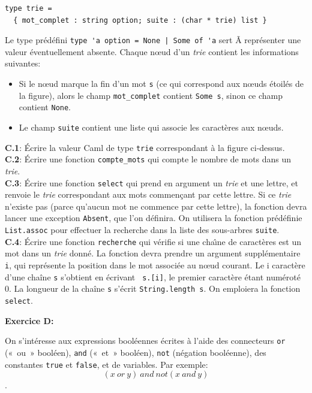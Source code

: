 \documentclass[11pt, a4paper]{article}
\begin{document}
\begin{verbatim}
type trie =
  { mot_complet : string option; suite : (char * trie) list }
\end{verbatim}

Le type prédéfini \verb+type 'a option = None | Some of 'a+ sert Ã
représenter une valeur éventuellement absente. Chaque nœud d'un
\emph{trie} contient les informations suivantes:

\begin{itemize}
  \item Si le nœud marque la fin d'un mot {\tt s} (ce qui
        correspond aux nœuds étoilés de la figure), alors le champ
        {\tt mot\_complet} contient {\tt Some s}, sinon ce champ
        contient {\tt None}.

  \item Le champ {\tt suite} contient une liste qui associe les
        caractères aux nœuds.
\end{itemize}

\medskip

\noindent
\textbf{C.1}: Écrire la valeur Caml de type \verb+trie+ correspondant
à la figure ci-dessus.\\
\textbf{C.2}: Écrire une fonction \texttt{compte\_mots} qui compte le
nombre de mots dans un \emph{trie}.\\
\textbf{C.3}: Écrire une fonction \texttt{select} qui prend en
argument un \emph{trie} et une lettre, et renvoie le \emph{trie}
correspondant aux mots commençant par cette lettre. Si ce \emph{trie}
n'existe pas (parce qu'aucun mot ne commence par cette lettre), la
fonction devra lancer une exception {\tt Absent}, que l'on
définira. On utilisera la fonction prédéfinie \texttt{List.assoc} pour
effectuer la recherche dans la liste des sous-arbres \verb+suite+.\\
\textbf{C.4}: Écrire une fonction \texttt{recherche} qui vérifie si
une cha\^{\i}ne de caractères est un mot dans un {\em trie}
donné. La fonction devra prendre un argument supplémentaire {\tt i},
qui représente la position dans le mot associée au nœud courant.
Le i\ieme{} caractère d'une chaîne {\tt s} s'obtient en écrivant {\tt
s.[i]}, le premier caractère étant numéroté $0$. La longueur de la
chaîne {\tt s} s'écrit {\tt String.length s}. On emploiera la fonction
\texttt{select}.

\medskip

\textbf{Exercice D:}

\noindent
On s'intéresse aux expressions booléennes écrites à l'aide des
connecteurs \texttt{or} («~ou~» booléen), \texttt{and} («~et~»
booléen), \texttt{not} (négation booléenne), des constantes
\texttt{true} et \texttt{false}, et de variables.  Par exemple: $$(x
~or~ y) ~and~ not(x ~and~ y)$$.
\end{document}
